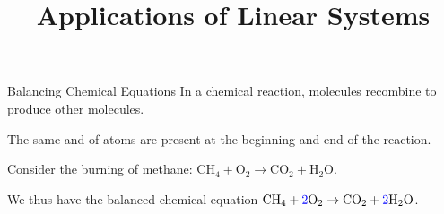 \documentclass[xcolor=dvipsnames,aspectratio=169,t]{beamer}
\title{Applications of Linear Systems}
\begin{document}
\maketitle

\begin{frame}{Balancing Chemical Equations}
  In a chemical reaction, molecules recombine to produce other molecules.
  
  The same  and  of atoms are present at the beginning and end of the reaction.
  \bigskip
  
  Consider the burning of methane:
  $ \mathrm{C}\mathrm{H}_4 + \mathrm{O}_2 \rightarrow 
    \mathrm{C}\mathrm{O}_2 + \mathrm{H}_2 \mathrm{O}$.
    
  \vspace*{3em}
  
  \pause
  We thus have the \alert{balanced} chemical equation 
  $ \mathrm{C}\mathrm{H}_4 + \textcolor{blue}{2}\mathrm{O}_2 \rightarrow 
    \mathrm{C}\mathrm{O}_2 + \textcolor{blue}{2}\mathrm{H}_2 \mathrm{O}$.

\end{frame}
\end{document}
